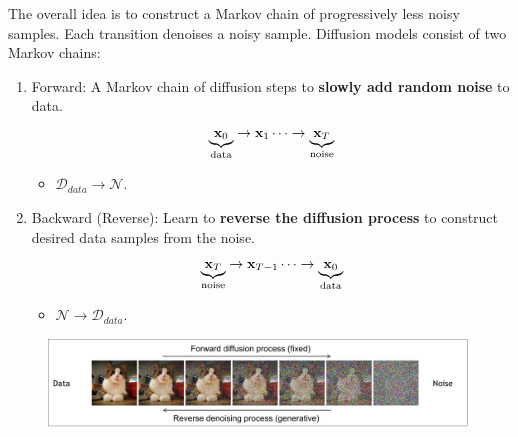 	The overall idea is to construct a Markov chain of progressively less noisy samples. Each transition denoises a noisy sample. Diffusion models consist of two Markov chains:
	\begin{enumerate}
		\item Forward: A Markov chain of diffusion steps to \textbf{slowly add random noise} to data. 
			$$\underbrace{{\mathbf{x}}_0}_{\text{data}}\to {\mathbf{x}}_1\cdots\to \underbrace{{\mathbf{x}}_T}_{\text{noise}}$$
			\begin{itemize}
				\item $\mathcal{D}_{data}\to \mathcal{N}$.
			\end{itemize}
		\item Backward (Reverse): Learn to \textbf{reverse the diffusion process} to construct desired data samples from the noise. 
			$$\underbrace{{\mathbf{x}}_T}_{\text{noise}}\to {\mathbf{x}}_{T-1}\cdots\to \underbrace{{\mathbf{x}}_0}_{\text{data}}$$

			\begin{itemize}
				\item $\mathcal{N}\to \mathcal{D}_{data}$.
			\end{itemize}
	\end{enumerate}
	\begin{figure}[t]
		\centering
		\includegraphics[scale=0.28]{./images/diffusion/diffusion_model.png}
	\end{figure}

